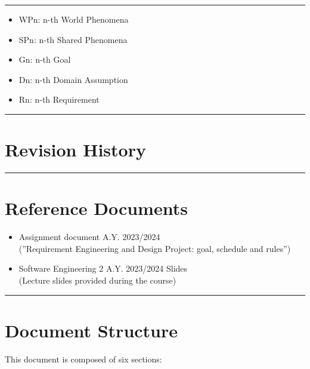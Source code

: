 \documentclass{Configuration_Files/Template}
\begin{document}
{\color{bluepoli}\rule{\linewidth}{0.1pt}}

\begin{itemize}
\item \textcolor{bluepoli}{WPn:} n-th World Phenomena
\item \textcolor{bluepoli}{SPn:} n-th Shared Phenomena
\item \textcolor{bluepoli}{Gn:} n-th Goal
\item \textcolor{bluepoli}{Dn:} n-th Domain Assumption
\item \textcolor{bluepoli}{Rn:} n-th Requirement
\end{itemize}

{\color{bluepoli}\rule{\linewidth}{0.1pt}}

\section{Revision History}

{\color{bluepoli}\rule{\linewidth}{0.1pt}}

\section{Reference Documents}

\begin{itemize}
\item \textcolor{bluepoli}{Assignment document A.Y. 2023/2024}\\
(”Requirement Engineering and Design Project: goal, schedule and rules”)
\item \textcolor{bluepoli}{Software Engineering 2 A.Y. 2023/2024 Slides}\\
(Lecture slides provided during the course)
\end{itemize}

{\color{bluepoli}\rule{\linewidth}{0.1pt}}

\section{Document Structure}

This document is composed of six sections:
\end{document}
